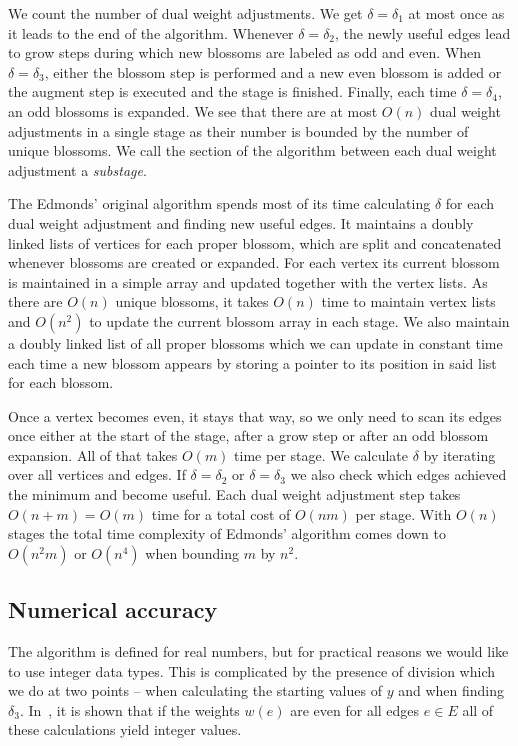 We count the number of dual weight adjustments. We get $\delta = \delta_1$ at most once as it leads to the end of the algorithm. Whenever $\delta = \delta_2$, the newly useful edges lead to grow steps during which new blossoms are labeled as odd and even. When $\delta = \delta_3$, either the blossom step is performed and a new even blossom is added or the augment step is executed and the stage is finished. Finally, each time $\delta = \delta_4$, an odd blossoms is expanded. We see that there are at most $O(n)$ dual weight adjustments in a single stage as their number is bounded by the number of unique blossoms. We call the section of the algorithm between each dual weight adjustment a \textit{substage}.

The Edmonds' original algorithm spends most of its time calculating $\delta$ for each dual weight adjustment and finding new useful edges. It maintains a doubly linked lists of vertices for each proper blossom, which are split and concatenated whenever blossoms are created or expanded. For each vertex its current blossom is maintained in a simple array and updated together with the vertex lists. As there are $O(n)$ unique blossoms, it takes $O(n)$ time to maintain vertex lists and $O(n^2)$ to update the current blossom array in each stage. We also maintain a doubly linked list of all proper blossoms which we can update in constant time each time a new blossom appears by storing a pointer to its position in said list for each blossom.

Once a vertex becomes even, it stays that way, so we only need to scan its edges once either at the start of the stage, after a grow step or after an odd blossom expansion. All of that takes $O(m)$ time per stage. We calculate $\delta$ by iterating over all vertices and edges. If $\delta = \delta_2$ or $\delta = \delta_3$ we also check which edges achieved the minimum and become useful. Each dual weight adjustment step takes $O(n+m)=O(m)$ time for a total cost of $O(nm)$ per stage. With $O(n)$ stages the total time complexity of Edmonds' algorithm comes down to $O(n^2m)$ or $O(n^4)$ when bounding $m$ by $n^2$.

\subsection{Numerical accuracy}

The algorithm is defined for real numbers, but for practical reasons we would like to use integer data types. This is complicated by the presence of division which we do at two points – when calculating the starting values of $y$ and when finding $\delta_3$. In~\cite{gabow1974implementation}, it is shown that if the weights $w(e)$ are even for all edges $e\in E$ all of these calculations yield integer values.

